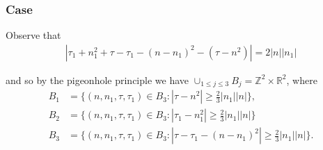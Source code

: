 \documentclass[12pt,reqno]{amsart}
\numberwithin{equation}{section}  %
\renewcommand{\cref}{\Cref}
\newcommand{\rr}{\mathbb{R}}
\newcommand{\zz}{\mathbb{Z}}
\begin{document}
\subsubsection{Case \cref{it-4}} 
\label{ssec:case-it-4}
Observe that
%
%
\begin{equation*}
\begin{split}
  | \tau_{1} + n_{1}^{2} + \tau - \tau_{1} - (n - n_{1})^{2} - (\tau - n^{2}) | = 2| n || n_{1}|
\end{split}
\end{equation*}

%
and so by the pigeonhole principle we have $\cup_{1 \le j \le 3} B_{j} = \zz^{2} \times \rr^{2}$, where 
\begin{align*}
  B_{1}&=\{(n, n_1, \tau, \tau_1)\in B_3: |\tau-n^{2}|\ge \frac{2}{3} |n_{1}|| n |\},\\
  B_{2}&=\{(n, n_1, \tau, \tau_1)\in B_3: |\tau_{1}-n_{1}^2|\ge \frac{2}{3} |n_{1}||n | \}\\
  B_{3}&=\{(n, n_1, \tau, \tau_1)\in B_3: |\tau - \tau_{1}-(n - n_{1})^2|\ge \frac{2}{3} |n_{1}||n| \}.
\end{align*} 
\end{document}
